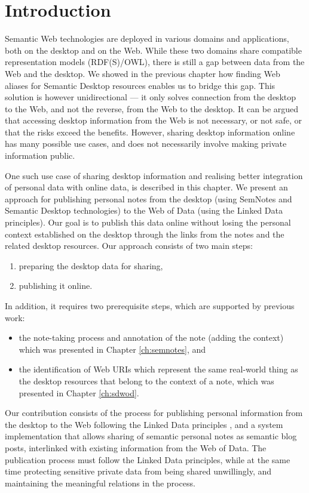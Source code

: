 \section{Introduction}
\label{sec:introduction}

Semantic Web technologies are deployed in various domains and applications, both on the desktop and on the Web.
While these two domains share compatible representation models (RDF(S)/OWL), there is still a gap between data from the Web and the desktop. We showed in the previous chapter how finding Web aliases for Semantic Desktop resources enables us to bridge this gap. This solution is however unidirectional --- it only solves connection from the desktop to the Web, and not the reverse, from the Web to the desktop. It can be argued that accessing desktop information from the Web is not necessary, or not safe, or that the risks exceed the benefits. However, sharing desktop information online has many possible use cases, and does not necessarily involve making private information public. 

One such use case of sharing desktop information and realising better integration of personal data with online data, is described in this chapter. We present an approach for publishing personal notes from the desktop (using SemNotes and Semantic Desktop technologies) to the Web of Data (using the Linked Data principles). Our goal is to publish this data online without losing the personal context established on the desktop through the links from the notes and the related desktop resources.
Our approach consists of two main steps: 
\begin{enumerate}
 \item preparing the desktop data for sharing, 
 \item publishing it online. 
\end{enumerate}
In addition, it requires two prerequisite steps, which are supported by previous work: 
\begin{itemize} 
 \item the note-taking process and annotation of the note (adding the context) which was presented in Chapter \ref{ch:semnotes}, and 
 \item the identification of Web URIs which represent the same real-world thing as the desktop resources that belong to the context of a note, which was presented in Chapter \ref{ch:sdwod}. 
\end{itemize}

Our contribution consists of the process for publishing personal information from the desktop to the Web following the Linked Data principles \cite{BernersLee2006}, and a system implementation that allows sharing of semantic personal notes as semantic blog posts, interlinked with existing information from the Web of Data. 
The publication process must follow the Linked Data principles, while at the same time protecting sensitive private data from being shared unwillingly, and maintaining the meaningful relations in the process.


